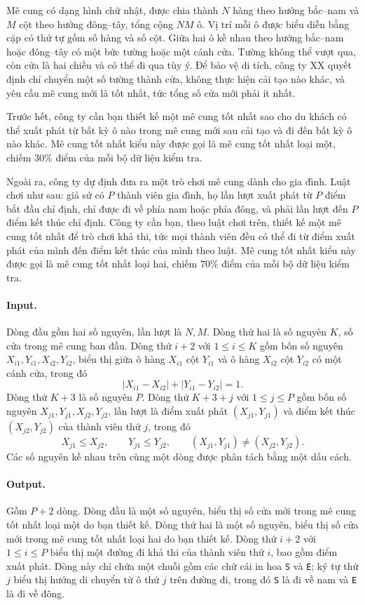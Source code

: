 \documentclass[11pt]{article}
\begin{document}
Mê cung có dạng hình chữ nhật, được chia thành $N$ hàng theo hướng bắc--nam
và $M$ cột theo hướng đông--tây, tổng cộng $N M$ ô. Vị trí mỗi ô được biểu
diễn bằng cặp có thứ tự gồm số hàng và số cột. Giữa hai ô kề nhau theo hướng
bắc--nam hoặc đông--tây có một bức tường hoặc một cánh cửa. Tường không thể
vượt qua, còn cửa là hai chiều và có thể đi qua tùy ý. Để bảo vệ di tích,
công ty XX quyết định chỉ chuyển một số tường thành cửa, không thực hiện cải
tạo nào khác, và yêu cầu mê cung mới là tốt nhất, tức tổng số cửa mới phải ít
nhất.

Trước hết, công ty cần bạn thiết kế một mê cung tốt nhất sao cho du khách có
thể xuất phát từ bất kỳ ô nào trong mê cung mới sau cải tạo và đi đến bất kỳ
ô nào khác. Mê cung tốt nhất kiểu này được gọi là mê cung tốt nhất loại một,
chiếm $30\%$ điểm của mỗi bộ dữ liệu kiểm tra.

Ngoài ra, công ty dự định đưa ra một trò chơi mê cung dành cho gia đình. Luật
chơi như sau: giả sử có $P$ thành viên gia đình, họ lần lượt xuất phát từ $P$
điểm bắt đầu chỉ định, chỉ được đi về phía nam hoặc phía đông, và phải lần
lượt đến $P$ điểm kết thúc chỉ định. Công ty cần bạn, theo luật chơi trên,
thiết kế một mê cung tốt nhất để trò chơi khả thi, tức mọi thành viên đều có
thể đi từ điểm xuất phát của mình đến điểm kết thúc của mình theo luật. Mê
cung tốt nhất kiểu này được gọi là mê cung tốt nhất loại hai, chiếm $70\%$
điểm của mỗi bộ dữ liệu kiểm tra.

\paragraph{Input.}
Dòng đầu gồm hai số nguyên, lần lượt là $N,M$. Dòng thứ hai là số nguyên $K$,
số cửa trong mê cung ban đầu. Dòng thứ $i+2$ với $1\le i\le K$ gồm bốn số
nguyên $X_{i1},Y_{i1},X_{i2},Y_{i2}$, biểu thị giữa ô hàng $X_{i1}$ cột
$Y_{i1}$ và ô hàng $X_{i2}$ cột $Y_{i2}$ có một cánh cửa, trong đó
\[
  |X_{i1}-X_{i2}|+|Y_{i1}-Y_{i2}|=1.
\]
Dòng thứ $K+3$ là số nguyên $P$. Dòng thứ $K+3+j$ với $1\le j\le P$ gồm bốn
số nguyên $X_{j1},Y_{j1},X_{j2},Y_{j2}$, lần lượt là điểm xuất phát
$(X_{j1},Y_{j1})$ và điểm kết thúc $(X_{j2},Y_{j2})$ của thành viên thứ $j$,
trong đó
\[
  X_{j1}\le X_{j2},\qquad Y_{j1}\le Y_{j2},\qquad
  (X_{j1},Y_{j1})\ne (X_{j2},Y_{j2}).
\]
Các số nguyên kề nhau trên cùng một dòng được phân tách bằng một dấu cách.

\paragraph{Output.}
Gồm $P+2$ dòng. Dòng đầu là một số nguyên, biểu thị số cửa mới trong mê cung
tốt nhất loại một do bạn thiết kế. Dòng thứ hai là một số nguyên, biểu thị số
cửa mới trong mê cung tốt nhất loại hai do bạn thiết kế. Dòng thứ $i+2$ với
$1\le i\le P$ biểu thị một đường đi khả thi của thành viên thứ $i$, bao gồm
điểm xuất phát. Dòng này chỉ chứa một chuỗi gồm các chữ cái in hoa
\texttt{S} và \texttt{E}; ký tự thứ $j$ biểu thị hướng di chuyển từ ô thứ
$j$ trên đường đi, trong đó \texttt{S} là đi về nam và \texttt{E} là đi về
đông.
\end{document}
